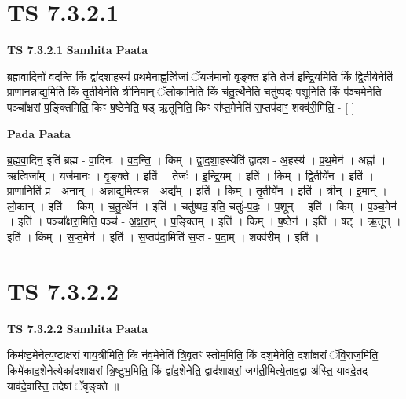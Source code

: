 \documentclass[17pt]{extarticle}
\begin{document}
\section*{ TS 7.3.2.1 }

\textbf{TS 7.3.2.1 } \newline
\textbf{Samhita Paata} \newline

ब्र॒ह्म॒वा॒दिनो॑ वदन्ति॒ किं द्वा॑दशा॒हस्य॑ प्रथ॒मेनाह्न॒र्त्विजां॒ ॅयज॑मानो वृङ्क्त॒ इति॒ तेज॑ इन्द्रि॒यमिति॒ किं द्वि॒तीये॒नेति॑ प्रा॒णान॒न्नाद्य॒मिति॒ किं तृ॒तीये॒नेति॒ त्रीनि॒मान् ॅलो॒कानिति॒ किं च॑तु॒र्त्थेनेति॒ चतु॑ष्पदः प॒शूनिति॒ किं प॑ञ्च॒मेनेति॒ पञ्चा᳚क्षरां प॒ङ्क्तिमिति॒ किꣳ ष॒ष्ठेनेति॒ षड् ऋ॒तूनिति॒ किꣳ स॑प्त॒मेनेति॑ स॒प्तप॑दाꣳ॒॒ शक्व॑री॒मिति॒ - [  ] \newline

\textbf{Pada Paata} \newline

ब्र॒ह्म॒वा॒दिन॒ इति॑ ब्रह्म - वा॒दिनः॑ । व॒द॒न्ति॒ । किम् । द्वा॒द॒शा॒हस्येति॑ द्वादश - अ॒हस्य॑ । प्र॒थ॒मेन॑ । अह्ना᳚ । ऋ॒त्विजा᳚म् । यज॑मानः । वृ॒ङ्क्ते॒ । इति॑ । तेजः॑ । इ॒न्द्रि॒यम् । इति॑ । किम् । द्वि॒तीये॑न । इति॑ । प्रा॒णानिति॑ प्र - अ॒नान् । अ॒न्नाद्य॒मित्य॑न्न - अद्य᳚म् । इति॑ । किम् । तृ॒तीये॑न । इति॑ । त्रीन् । इ॒मान् । लो॒कान् । इति॑ । किम् । च॒तु॒र्त्थेन॑ । इति॑ । चतु॑ष्पद॒ इति॒ चतुः॑-प॒दः॒ । प॒शून् । इति॑ । किम् । प॒ञ्च॒मेन॑ । इति॑ । पञ्चा᳚क्षरा॒मिति॒ पञ्च॑ - अ॒क्ष॒रा॒म् । प॒ङ्क्तिम् । इति॑ । किम् । ष॒ष्ठेन॑ । इति॑ । षट् । ऋ॒तून् । इति॑ । किम् । स॒प्त॒मेन॑ । इति॑ । स॒प्तप॑दा॒मिति॑ स॒प्त - प॒दा॒म् । शक्व॑रीम् । इति॑ ।  \newline




\section*{ TS 7.3.2.2 }

\textbf{TS 7.3.2.2 } \newline
\textbf{Samhita Paata} \newline

किम॑ष्ट॒मेनेत्य॒ष्टाक्ष॑रां गाय॒त्रीमिति॒ किं न॑व॒मेनेति॑ त्रि॒वृतꣳ॒॒ स्तोम॒मिति॒ किं द॑श॒मेनेति॒ दशा᳚क्षरां ॅवि॒राज॒मिति॒ किमे॑काद॒शेनेत्येका॑दशाक्षरां त्रि॒ष्टुभ॒मिति॒ किं द्वा॑द॒शेनेति॒ द्वाद॑शाक्षरां॒ जग॑ती॒मित्ये॒ताव॒द्वा अ॑स्ति॒ याव॑दे॒तद्-याव॑दे॒वास्ति॒ तदे॑षां ॅवृङ्क्ते ॥ \newline
\end{document}
